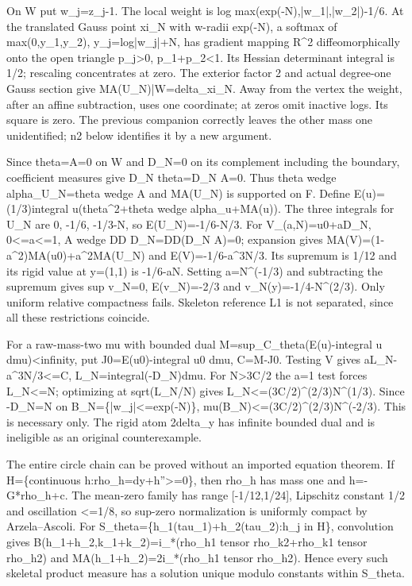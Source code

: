 \documentclass[11pt]{article}
\begin{document}
On W put w\_j=z\_j-1. The local weight is log max(exp(-N),|w\_1|,|w\_2|)-1/6. At the translated Gauss point xi\_N with w-radii exp(-N), a softmax of max(0,y\_1,y\_2), y\_j=log|w\_j|+N, has gradient mapping R\textasciicircum{}2 diffeomorphically onto the open triangle p\_j>0, p\_1+p\_2<1. Its Hessian determinant integral is 1/2; rescaling concentrates at zero. The exterior factor 2 and actual degree-one Gauss section give MA(U\_N)|W=delta\_xi\_N. Away from the vertex the weight, after an affine subtraction, uses one coordinate; at zeros omit inactive logs. Its square is zero. The previous companion correctly leaves the other mass one unidentified; n2 below identifies it by a new argument.

Since theta=A=0 on W and D\_N=0 on its complement including the boundary, coefficient measures give D\_N theta=D\_N A=0. Thus theta wedge alpha\_U\_N=theta wedge A and MA(U\_N) is supported on F. Define E(u)=(1/3)integral u(theta\textasciicircum{}2+theta wedge alpha\_u+MA(u)). The three integrals for U\_N are 0, -1/6, -1/3-N, so E(U\_N)=-1/6-N/3. For V\_(a,N)=u0+aD\_N, 0<=a<=1, A wedge DD D\_N=DD(D\_N A)=0; expansion gives MA(V)=(1-a\textasciicircum{}2)MA(u0)+a\textasciicircum{}2MA(U\_N) and E(V)=-1/6-a\textasciicircum{}3N/3. Its supremum is 1/12 and its rigid value at y=(1,1) is -1/6-aN. Setting a=N\textasciicircum{}(-1/3) and subtracting the supremum gives sup v\_N=0, E(v\_N)=-2/3 and v\_N(y)=-1/4-N\textasciicircum{}(2/3). Only uniform relative compactness fails. Skeleton reference L1 is not separated, since all these restrictions coincide.

For a raw-mass-two mu with bounded dual M=sup\_C\_theta(E(u)-integral u dmu)<infinity, put J0=E(u0)-integral u0 dmu, C=M-J0. Testing V gives aL\_N-a\textasciicircum{}3N/3<=C, L\_N=integral(-D\_N)dmu. For N>3C/2 the a=1 test forces L\_N<=N; optimizing at sqrt(L\_N/N) gives L\_N<=(3C/2)\textasciicircum{}(2/3)N\textasciicircum{}(1/3). Since -D\_N=N on B\_N=\{|w\_j|<=exp(-N)\}, mu(B\_N)<=(3C/2)\textasciicircum{}(2/3)N\textasciicircum{}(-2/3). This is necessary only. The rigid atom 2delta\_y has infinite bounded dual and is ineligible as an original counterexample.

The entire circle chain can be proved without an imported equation theorem. If H=\{continuous h:rho\_h=dy+h''>=0\}, then rho\_h has mass one and h=-G*rho\_h+c. The mean-zero family has range [-1/12,1/24], Lipschitz constant 1/2 and oscillation <=1/8, so sup-zero normalization is uniformly compact by Arzela--Ascoli. For S\_theta=\{h\_1(tau\_1)+h\_2(tau\_2):h\_j in H\}, convolution gives B(h\_1+h\_2,k\_1+k\_2)=i\_*(rho\_h1 tensor rho\_k2+rho\_k1 tensor rho\_h2) and MA(h\_1+h\_2)=2i\_*(rho\_h1 tensor rho\_h2). Hence every such skeletal product measure has a solution unique modulo constants within S\_theta.
\end{document}
